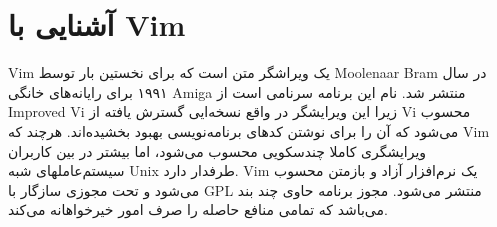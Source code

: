 \chapter{آشنایی با Vim}
Vim یک ویراشگر متن است که برای نخستین بار توسط Moolenaar Bram در سال ۱۹۹۱ برای رایانه‌های خانگی Amiga منتشر شد. نام این برنامه سرنامی است از Improved Vi زیرا این ویرایشگر در واقع نسخه‌ایی گسترش یافته از Vi محسوب می‌شود که آن را برای نوشتن کدهای برنامه‌نویسی بهبود بخشیده‌اند. هرچند که Vim ویرایشگری کاملا چندسکویی محسوب می‌شود، اما بیشتر در بین کاربران سیستم‌عاملهای شبه Unix طرفدار دارد. Vim یک نرم‌افزار آزاد و بازمتن محسوب می‌شود و تحت مجوزی سازگار با GPL منتشر می‌شود. مجوز برنامه حاوی چند بند می‌باشد که تمامی منافع حاصله را صرف امور خیرخواهانه می‌کند.

